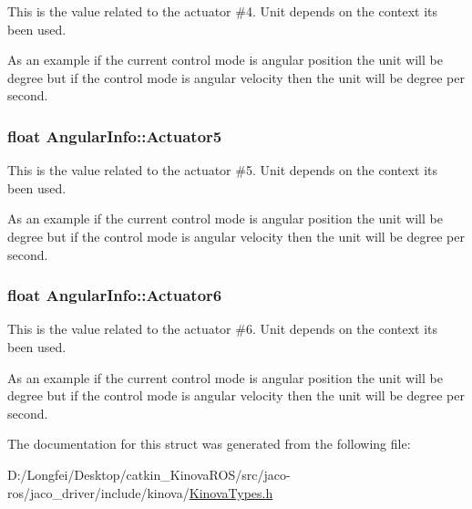 This is the value related to the actuator \#4. Unit depends on the context it\textquotesingle{}s been used. 

As an example if the current control mode is angular position the unit will be degree but if the control mode is angular velocity then the unit will be degree per second. 
\subsubsection[{\texorpdfstring{Actuator5}{Actuator5}}]{\setlength{\rightskip}{0pt plus 5cm}float Angular\+Info\+::\+Actuator5}\hypertarget{structAngularInfo_a953c29d2481eb1c42c84e9c992d34dde}{}\label{structAngularInfo_a953c29d2481eb1c42c84e9c992d34dde}


This is the value related to the actuator \#5. Unit depends on the context it\textquotesingle{}s been used. 

As an example if the current control mode is angular position the unit will be degree but if the control mode is angular velocity then the unit will be degree per second. 
\subsubsection[{\texorpdfstring{Actuator6}{Actuator6}}]{\setlength{\rightskip}{0pt plus 5cm}float Angular\+Info\+::\+Actuator6}\hypertarget{structAngularInfo_ab54771129d8a9e451c27942dd349340d}{}\label{structAngularInfo_ab54771129d8a9e451c27942dd349340d}


This is the value related to the actuator \#6. Unit depends on the context it\textquotesingle{}s been used. 

As an example if the current control mode is angular position the unit will be degree but if the control mode is angular velocity then the unit will be degree per second. 

The documentation for this struct was generated from the following file\+:\begin{DoxyCompactItemize}
\item 
D\+:/\+Longfei/\+Desktop/catkin\+\_\+\+Kinova\+R\+O\+S/src/jaco-\/ros/jaco\+\_\+driver/include/kinova/\hyperlink{KinovaTypes_8h}{Kinova\+Types.\+h}\end{DoxyCompactItemize}
